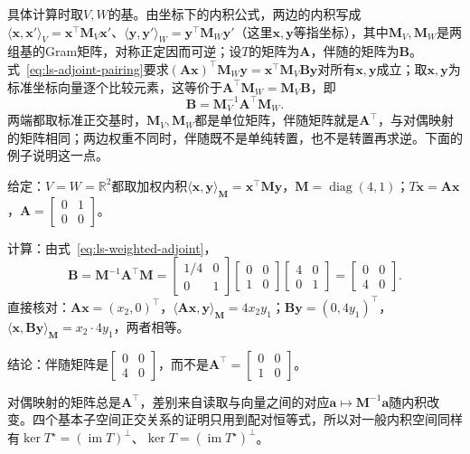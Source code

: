 具体计算时取$V,W$的基。由坐标下的内积公式，两边的内积写成$\langle\bm x,\bm x'\rangle_V=\bm x^\top\bm M_V\bm x'$、$\langle\bm y,\bm y'\rangle_W=\bm y^\top\bm M_W\bm y'$（这里$\bm x,\bm y$等指坐标），其中$\bm M_V,\bm M_W$是两组基的Gram矩阵，对称正定因而可逆；设$T$的矩阵为$\bm A$，伴随的矩阵为$\bm B$。式~\eqref{eq:ls-adjoint-pairing}要求$(\bm A\bm x)^\top\bm M_W\bm y=\bm x^\top\bm M_V\bm B\bm y$对所有$\bm x,\bm y$成立；取$\bm x,\bm y$为标准坐标向量逐个比较元素，这等价于$\bm A^\top\bm M_W=\bm M_V\bm B$，即
\begin{equation}
 \bm B=\bm M_V^{-1}\bm A^\top\bm M_W.
 \label{eq:ls-weighted-adjoint}
\end{equation}
两端都取标准正交基时，$\bm M_V,\bm M_W$都是单位矩阵，伴随矩阵就是$\bm A^\top$，与对偶映射的矩阵相同；两边权重不同时，伴随既不是单纯转置，也不是转置再求逆。下面的例子说明这一点。
\begin{example}[加权内积下的伴随]
\label{ex:ls-weighted-adjoint}
给定：$V=W=\mathbb R^2$都取加权内积$\langle\bm x,\bm y\rangle_{\bm M}=\bm x^\top\bm M\bm y$，$\bm M=\operatorname{diag}(4,1)$；$T\bm x=\bm A\bm x$，$\bm A=\left[\begin{smallmatrix}0&1\\0&0\end{smallmatrix}\right]$。

计算：由式~\eqref{eq:ls-weighted-adjoint}，
\[
 \bm B=\bm M^{-1}\bm A^\top\bm M
 =\begin{bmatrix}1/4&0\\0&1\end{bmatrix}\begin{bmatrix}0&0\\1&0\end{bmatrix}\begin{bmatrix}4&0\\0&1\end{bmatrix}
 =\begin{bmatrix}0&0\\4&0\end{bmatrix}.
\]
直接核对：$\bm A\bm x=(x_2,0)^\top$，$\langle\bm A\bm x,\bm y\rangle_{\bm M}=4x_2y_1$；$\bm B\bm y=(0,4y_1)^\top$，$\langle\bm x,\bm B\bm y\rangle_{\bm M}=x_2\cdot4y_1$，两者相等。

结论：伴随矩阵是$\left[\begin{smallmatrix}0&0\\4&0\end{smallmatrix}\right]$，而不是$\bm A^\top=\left[\begin{smallmatrix}0&0\\1&0\end{smallmatrix}\right]$。
\end{example}
对偶映射的矩阵总是$\bm A^\top$，差别来自读取与向量之间的对应$\bm a\mapsto\bm M^{-1}\bm a$随内积改变。四个基本子空间正交关系的证明只用到配对恒等式，所以对一般内积空间同样有$\ker T^\star=(\operatorname{im}T)^\perp$、$\ker T=(\operatorname{im}T^\star)^\perp$。

